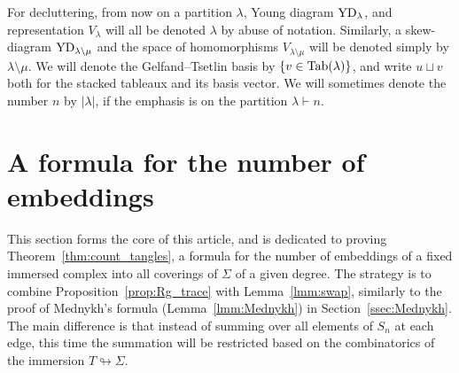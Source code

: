 \documentclass{amsart}
\newcommand{\tn}{\textnormal}
\begin{document}
For decluttering, from now on a partition $\lambda$, Young diagram $\tn{YD}_\lambda$, and representation $V_\lambda$ will all be denoted $\lambda$ by abuse of notation. Similarly, a skew-diagram $\tn{YD}_{\lambda\setminus\mu}$ and the space of homomorphisms $V_{\lambda\setminus\mu}$ will be denoted simply by $\lambda\setminus\mu$. We will denote the Gelfand--Tsetlin basis by $\{v\in\tn{Tab}(\lambda)\}$, and write $u\sqcup v$ both for the stacked tableaux and its basis vector. We will sometimes denote the number $n$ by $|\lambda|$, if the emphasis is on the partition $\lambda\vdash n$.

\section{A formula for the number of embeddings}\label{sec:counting}

This section forms the core of this article, and is dedicated to proving Theorem~\ref{thm:count_tangles}, a formula for the number of embeddings of a fixed immersed complex into all coverings of $\Sigma$ of a given degree. The strategy is to combine Proposition~\ref{prop:Rg_trace} with Lemma~\ref{lmm:swap}, similarly to the proof of Mednykh's formula (Lemma~\ref{lmm:Mednykh}) in Section~\ref{ssec:Mednykh}. The main difference is that instead of summing over all elements of $S_n$ at each edge, this time the summation will be restricted based on the combinatorics of the immersion $T\looparrowright\Sigma$.
\end{document}

